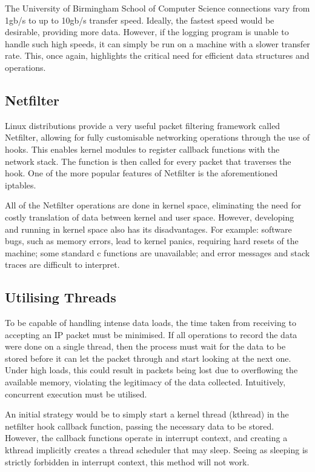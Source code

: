 \documentclass[twocolumn,10pt]{asme2ej}
\begin{document}
The University of Birmingham School of Computer Science connections vary from 1gb/s to up to 10gb/s transfer speed. Ideally, the fastest speed would be desirable, providing more data. However, if the logging program is unable to handle such high speeds, it can simply be run on a machine with a slower transfer rate. This, once again, highlights the critical need for efficient data structures and operations.

\subsection{Netfilter\cite{netfilter}}
Linux distributions provide a very useful packet filtering framework called Netfilter, allowing for fully customisable networking operations through the use of hooks. This enables kernel modules to register callback functions with the network stack. The function is then called for every packet that traverses the hook. One of the more popular features of Netfilter is the aforementioned iptables.

All of the Netfilter operations are done in kernel space, eliminating the need for costly translation of data between kernel and user space. However, developing and running in kernel space also has its disadvantages. For example: software bugs, such as memory errors, lead to kernel panics, requiring hard resets of the machine; some standard c functions are unavailable; and error messages and stack traces are difficult to interpret.

\subsection{Utilising Threads}
To be capable of handling intense data loads, the time taken from receiving to accepting an IP packet must be minimised. If all operations to record the data were done on a single thread, then the process must wait for the data to be stored before it can let the packet through and start looking at the next one. Under high loads, this could result in packets being lost due to overflowing the available memory, violating the legitimacy of the data collected. Intuitively, concurrent execution must be utilised.

An initial strategy would be to simply start a kernel thread (kthread) in the netfilter hook callback function, passing the necessary data to be stored. However, the callback functions operate in interrupt context, and creating a kthread implicitly creates a thread scheduler that may sleep. Seeing as sleeping is strictly forbidden in interrupt context, this method will not work.
\end{document}
